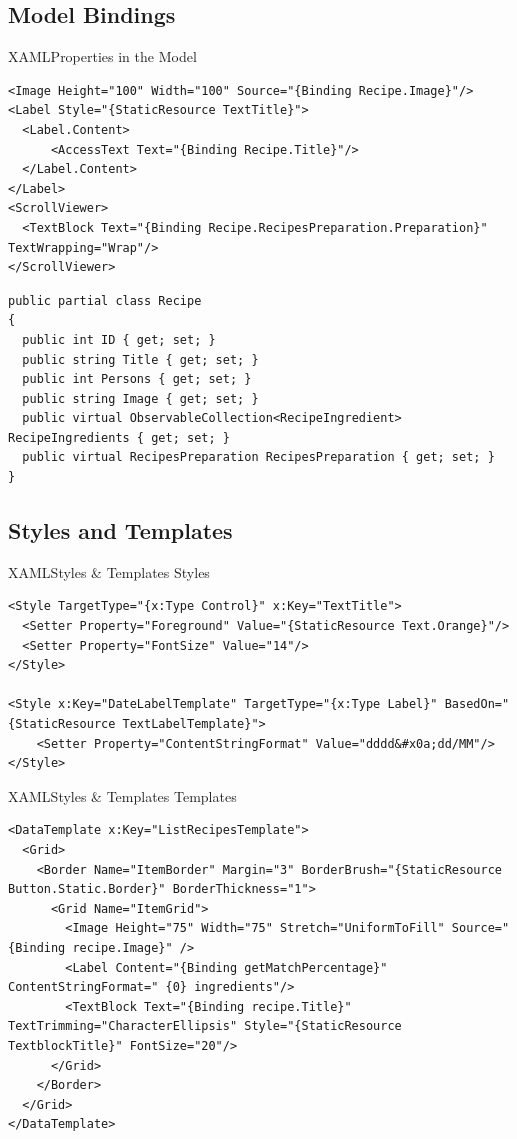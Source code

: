 
\subsection{Model Bindings} 
\begin{frame}[fragile]{XAML}{Properties in the Model}

\begin{lstlisting}
<Image Height="100" Width="100" Source="{Binding Recipe.Image}"/>
<Label Style="{StaticResource TextTitle}">
  <Label.Content>
      <AccessText Text="{Binding Recipe.Title}"/>
  </Label.Content>
</Label>
<ScrollViewer>
  <TextBlock Text="{Binding Recipe.RecipesPreparation.Preparation}" TextWrapping="Wrap"/>
</ScrollViewer>
\end{lstlisting}

\begin{lstlisting}
public partial class Recipe
{
  public int ID { get; set; }
  public string Title { get; set; }
  public int Persons { get; set; }
  public string Image { get; set; }
  public virtual ObservableCollection<RecipeIngredient> RecipeIngredients { get; set; }
  public virtual RecipesPreparation RecipesPreparation { get; set; }
}
\end{lstlisting}

\end{frame}


\subsection{Styles and Templates} 
\begin{frame}[fragile]{XAML}{Styles \& Templates}
Styles
\begin{lstlisting}
<Style TargetType="{x:Type Control}" x:Key="TextTitle">
  <Setter Property="Foreground" Value="{StaticResource Text.Orange}"/>
  <Setter Property="FontSize" Value="14"/>
</Style>

<Style x:Key="DateLabelTemplate" TargetType="{x:Type Label}" BasedOn="{StaticResource TextLabelTemplate}">
    <Setter Property="ContentStringFormat" Value="dddd&#x0a;dd/MM"/>
</Style>
\end{lstlisting}

\end{frame}

\begin{frame}[fragile]{XAML}{Styles \& Templates}
Templates
\begin{lstlisting}
<DataTemplate x:Key="ListRecipesTemplate">
  <Grid>
    <Border Name="ItemBorder" Margin="3" BorderBrush="{StaticResource Button.Static.Border}" BorderThickness="1">
      <Grid Name="ItemGrid">
        <Image Height="75" Width="75" Stretch="UniformToFill" Source="{Binding recipe.Image}" />
        <Label Content="{Binding getMatchPercentage}" ContentStringFormat=" {0} ingredients"/>
        <TextBlock Text="{Binding recipe.Title}" TextTrimming="CharacterEllipsis" Style="{StaticResource TextblockTitle}" FontSize="20"/>
      </Grid>
    </Border>
  </Grid>
</DataTemplate>
\end{lstlisting}
\end{frame}


